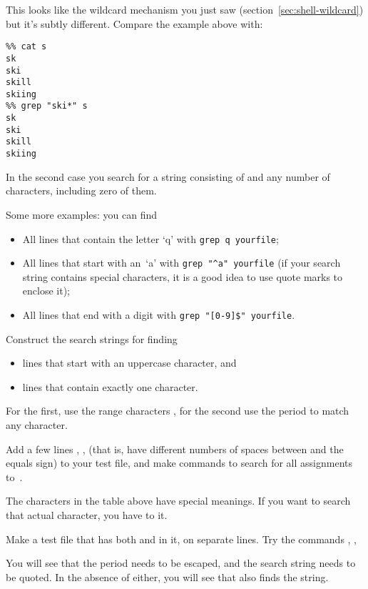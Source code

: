 This looks like the wildcard mechanism you just saw
(section~\ref{sec:shell-wildcard}) but it's subtly different. Compare
the example above with:
\begin{lstlisting}
%% cat s
sk
ski
skill
skiing
%% grep "ski*" s
sk
ski
skill
skiing
\end{lstlisting}
In the second case you search for a string consisting of  and
any number of  characters, including zero of them.

Some more examples: you can find
\begin{itemize}
\item All lines that contain the letter `q' with \verb+grep q yourfile+;
\item All lines that start with an~`a' with \verb+grep "^a" yourfile+
  (if your search string contains special characters, it is a good
  idea to use quote marks to enclose it);
\item All lines that end with a digit with \verb+grep "[0-9]$" yourfile+.
\end{itemize}

\begin{exercise}
  Construct the search strings for finding
    \begin{itemize}
    \item lines that start with an uppercase character, and
    \item lines that contain exactly one character.
    \end{itemize}
\end{exercise}
\begin{outcome}
  For the first, use the range characters \n{[]}, for the second use
  the period to match any character.
\end{outcome}

\begin{exercise}
  Add a few lines , ,  (that is,
  have different numbers of spaces between  and the equals sign)
  to your test file, and make  commands to search for all
  assignments to~.
\end{exercise}

The characters in the table above have special meanings. If you want
to search that actual character, you have to  it.

\begin{exercise}
  Make a test file that has both  and  in it, on
  separate lines.
  Try the commands , , 
\end{exercise}
\begin{outcome}
  You will see that the period needs to be escaped, and the search
    string needs to be quoted. In the absence of either, you will see
    that  also finds the  string.
\end{outcome}

